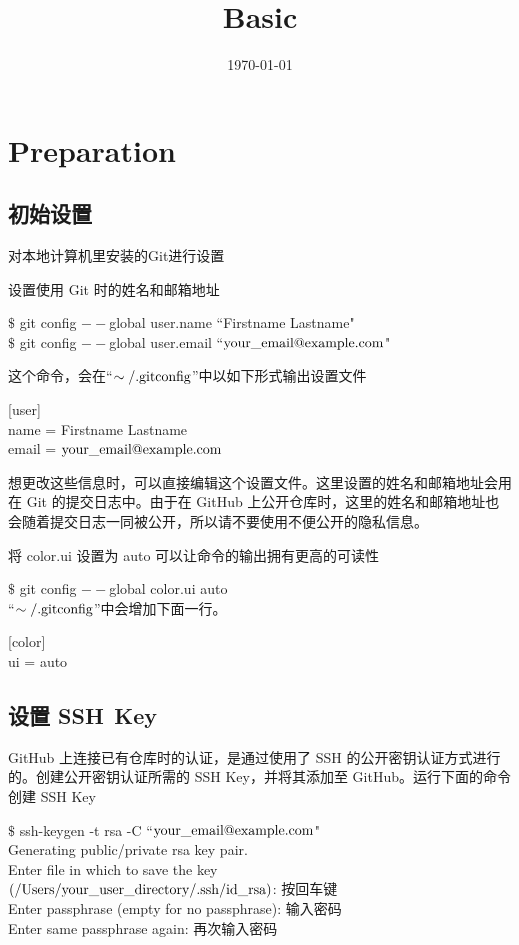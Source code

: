 \documentclass[12pt,a4paper]{article}
\title{Basic}
\author{}
\date{\today}
\begin{document}
\maketitle

\section{Preparation}

\subsection{初始设置}
对本地计算机里安装的Git进行设置

设置使用 Git 时的姓名和邮箱地址

$\$$ git config $--$global user.name ``Firstname Lastname" \\
$\$$ git config $--$global user.email ``$\rm your\_email@example.com$"

这个命令，会在``$\rm \sim/.gitconfig$”中以如下形式输出设置文件

[user] \\
name = Firstname Lastname \\
email = $\rm your\_email@example.com$

想更改这些信息时，可以直接编辑这个设置文件。这里设置的姓名和邮箱地址会用在 Git 的提交日志中。由于在 GitHub 上公开仓库时，这里的姓名和邮箱地址也会随着提交日志一同被公开，所以请不要使用不便公开的隐私信息。

将 color.ui 设置为 auto 可以让命令的输出拥有更高的可读性

$\$$ git config $--$global color.ui auto \\
``$\rm \sim/.gitconfig$”中会增加下面一行。

[color] \\
ui = auto

\subsection{设置 SSH Key}
GitHub 上连接已有仓库时的认证，是通过使用了 SSH 的公开密钥认证方式进行的。创建公开密钥认证所需的 SSH Key，并将其添加至 GitHub。运行下面的命令创建 SSH Key

$\$$ ssh-keygen -t rsa -C ``$\rm your\_email@example.com$" \\
Generating public/private rsa key pair. \\
Enter file in which to save the key \\
$\rm (/Users/your\_user\_directory/.ssh/id\_rsa)$: 按回车键 \\
Enter passphrase (empty for no passphrase): 输入密码 \\
Enter same passphrase again: 再次输入密码
\end{document}
